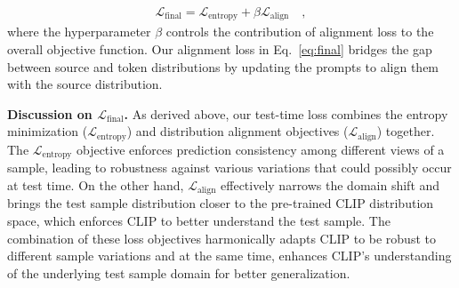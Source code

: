 \documentclass[a4paper]{article}
\begin{document}
\begin{align}
\label{eq:final}
    \mathcal{L}_{\text{final}} = \mathcal{L}_{\text{entropy}}   + \beta \mathcal{L}_{\text{align}} \quad ,
\end{align}
where the hyperparameter $\beta$ controls the contribution of alignment loss to the overall objective function. Our alignment loss in Eq.~\ref{eq:final}  bridges the gap between source and token distributions by updating the prompts to align them with the source distribution.



\textbf{Discussion on $\mathcal{L}_{\text{final}}$.}
As derived above, our test-time loss combines the entropy minimization ($\mathcal{L}_{\text{entropy}}$) and distribution alignment objectives ($\mathcal{L}_{\text{align}}$) together. The $\mathcal{L}_{\text{entropy}}$ objective enforces prediction consistency among different views of a sample, leading to robustness against various variations that could possibly occur at test time. On the other hand, $\mathcal{L}_{\text{align}}$ effectively narrows the domain shift and brings the test sample distribution closer to the pre-trained CLIP distribution space, which enforces CLIP to better understand the test sample. The combination of these loss objectives harmonically adapts CLIP to be robust to different sample variations and at the same time, enhances CLIP's understanding of the underlying test sample domain for better generalization. 
\end{document}
